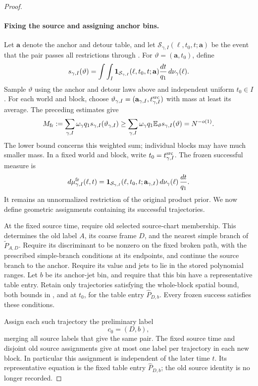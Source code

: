 \begin{proof}
\paragraph{Fixing the source and assigning anchor bins.}
Let \(\mathbf a\) denote the anchor and detour table, and let
\(\mathcal S_{\gamma,I}(\ell,t_0,t;\mathbf a)\) be the event that
the pair passes all restrictions through
.  For
\(\vartheta=(\mathbf a,t_0)\), define
\[
 s_{\gamma,I}(\vartheta)
 =\int\int_I
   \mathbf 1_{\mathcal S_{\gamma,I}}(\ell,t_0,t;\mathbf a)
       \frac{dt}{q_1}\,d\nu_\gamma(\ell).
\]
Sample \(\vartheta\) using the anchor and detour laws above and
independent uniform \(t_0\in I\).  For each world and block,
choose \(\vartheta_{\gamma,I}=(\mathbf a_{\gamma,I},t^{\rm src}_{\gamma,I})\)
with mass at least its average.  The preceding estimates give
\[
 M_{\rm fr}:=
 \sum_{\gamma,I}\omega_\gamma q_1
      s_{\gamma,I}(\vartheta_{\gamma,I})
 \ge
 \sum_{\gamma,I}\omega_\gamma q_1
      \mathbb E_\vartheta s_{\gamma,I}(\vartheta)
 =N^{-o(1)}.
\]
The lower bound concerns this weighted sum; individual blocks may
have much smaller mass.  In a fixed world and block, write
\(t_0=t^{\rm src}_{\gamma,I}\).  The frozen successful measure is
\[
 d\mu^{\rm fr}_{\gamma,I}(\ell,t)
 =\mathbf 1_{\mathcal S_{\gamma,I}}
   (\ell,t_0,t;\mathbf a_{\gamma,I})
       \,d\nu_\gamma(\ell)\,\frac{dt}{q_1}.
\]
It remains an unnormalized restriction of the original product
prior.  We now define geometric assignments containing its
successful trajectories.

At the fixed source time, require old selected source-chart
membership.  This determines the old label \(A\), its coarse
frame \(D\), and the nearest simple branch of
\(\widetilde P_{A,D}\).  Require its discriminant to be nonzero
on the fixed broken path,
with the prescribed simple-branch conditions at its endpoints,
and continue the source branch to the anchor.  Require its value
and jets to lie in the stored polynomial ranges.  Let \(b\) be
its anchor-jet bin, and require that this bin have a representative
table entry.  Retain only trajectories satisfying the whole-block
spatial bound, both bounds in , and
 at \(t_0\), for the table
entry \(\widehat P_{D,b}\).  Every frozen success satisfies these
conditions.

Assign each such trajectory the preliminary label
\[
 c_0=(D,b),
\]
merging all source labels that give the same pair.  The fixed
source time and disjoint old source assignments give at most one
label per trajectory in each new block.  In particular this
assignment is independent of the later time \(t\).  Its
representative equation is the fixed table entry
\(\widehat P_{D,b}\); the old source identity is no longer
recorded.


\end{proof}
